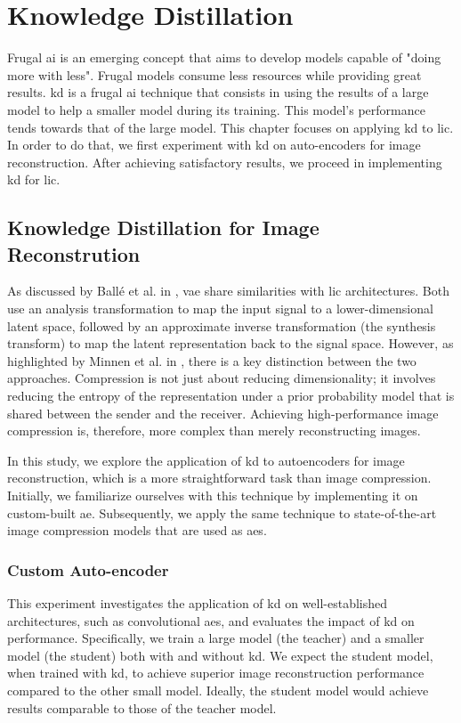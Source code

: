 \chapter{Knowledge Distillation}
\label{part_2}
Frugal \acrshort{ai} is an emerging concept that aims to develop models capable of "doing more with less". Frugal models consume less resources while providing great results. \acrfull{kd} is a frugal \acrshort{ai} technique that consists in using the results of a large model to help a smaller model during its training. This model's performance tends towards that of the large model. This chapter focuses on applying \acrshort{kd} to \acrshort{lic}. In order to do that, we first experiment with \acrshort{kd} on auto-encoders for image reconstruction. After achieving satisfactory results, we proceed in implementing \acrshort{kd} for \acrshort{lic}.

\section{Knowledge Distillation for Image Reconstrution}
As discussed by Ballé et al. in \cite{ballé2018variationalimagecompressionscale}, \acrfull{vae} share similarities with \acrshort{lic} architectures. Both use an analysis transformation to map the input signal to a lower-dimensional latent space, followed by an approximate inverse transformation (the synthesis transform) to map the latent representation back to the signal space. However, as highlighted by Minnen et al. in \cite{minnen2018jointautoregressivehierarchicalpriors}, there is a key distinction between the two approaches. Compression is not just about reducing dimensionality; it involves reducing the entropy of the representation under a prior probability model that is shared between the sender and the receiver. Achieving high-performance image compression is, therefore, more complex than merely reconstructing images.

In this study, we explore the application of \acrshort{kd} to autoencoders for image reconstruction, which is a more straightforward task than image compression. Initially, we familiarize ourselves with this technique by implementing it on custom-built \acrfull{ae}. Subsequently, we apply the same technique to state-of-the-art image compression models that are used as \acrshort{ae}s.

\subsection{Custom Auto-encoder}
This experiment investigates the application of \acrshort{kd} on well-established architectures, such as convolutional \acrshort{ae}s, and evaluates the impact of \acrshort{kd} on performance. Specifically, we train a large model (the teacher) and a smaller model (the student) both with and without \acrshort{kd}. We expect the student model, when trained with \acrshort{kd}, to achieve superior image reconstruction performance compared to the other small model. Ideally, the student model would achieve results comparable to those of the teacher model.

